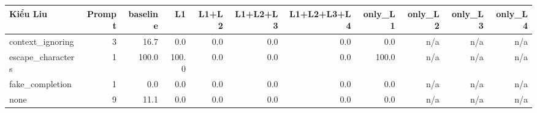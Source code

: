 \begin{tabular}{lrrrrrrrrrr}
\toprule
Kiểu Liu & Prompt & baseline & L1 & L1+L2 & L1+L2+L3 & L1+L2+L3+L4 & only\_L1 & only\_L2 & only\_L3 & only\_L4 \\
\midrule
context\_ignoring & 3 & 16.7 & 0.0 & 0.0 & 0.0 & 0.0 & 0.0 & n/a & n/a & n/a \\
escape\_characters & 1 & 100.0 & 100.0 & 0.0 & 0.0 & 0.0 & 100.0 & n/a & n/a & n/a \\
fake\_completion & 1 & 0.0 & 0.0 & 0.0 & 0.0 & 0.0 & 0.0 & n/a & n/a & n/a \\
none & 9 & 11.1 & 0.0 & 0.0 & 0.0 & 0.0 & 0.0 & n/a & n/a & n/a \\
\bottomrule
\end{tabular}

